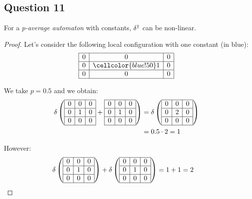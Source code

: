 
\subsection*{Question 11}

 \begin{prop}
    For a \textit{p-average automaton} with constants, $\delta^{\dag}$ can be non-linear.
 \end{prop}

 \begin{proof}
   Let's consider the following local configuration with one constant (in blue):
   \[\begin{array}{ | c | c | c |} \hline
    0 & 0 & 0 \\ \hline
    0 & \cellcolor{blue!50} 1 & 0 \\ \hline
    0 & 0 & 0 \\ \hline
  \end{array}\]
  
  We take $p=0.5$ and we obtain:
 \[\begin{split}
 \delta \left(\begin{array}{ | c | c | c |} \hline
  0 & 0 & 0 \\ \hline
  0 & 1 & 0 \\ \hline
  0 & 0 & 0 \\ \hline
 \end{array} + \begin{array}{ | c | c | c |} \hline
  0 & 0 & 0 \\ \hline
  0 & 1 & 0 \\ \hline
  0 & 0 & 0 \\ \hline
 \end{array} \right) & = \delta \left(\begin{array}{ | c | c | c |} \hline
  0 & 0 & 0 \\ \hline
  0 & 2 & 0 \\ \hline
  0 & 0 & 0 \\ \hline
 \end{array} \right) \\
		     & = 0.5 \cdot 2 = 1    
 \end{split}\]  
  
  However:
 \[\begin{split}
 \delta \left(\begin{array}{ | c | c | c |} \hline
  0 & 0 & 0 \\ \hline
  0 & 1 & 0 \\ \hline
  0 & 0 & 0 \\ \hline
 \end{array}\right) + \delta \left(\begin{array}{ | c | c | c |} \hline
  0 & 0 & 0 \\ \hline
  0 & 1 & 0 \\ \hline
  0 & 0 & 0 \\ \hline
 \end{array} \right) & = 1 + 1 = 2
 \end{split}\]  
  

\end{proof}
